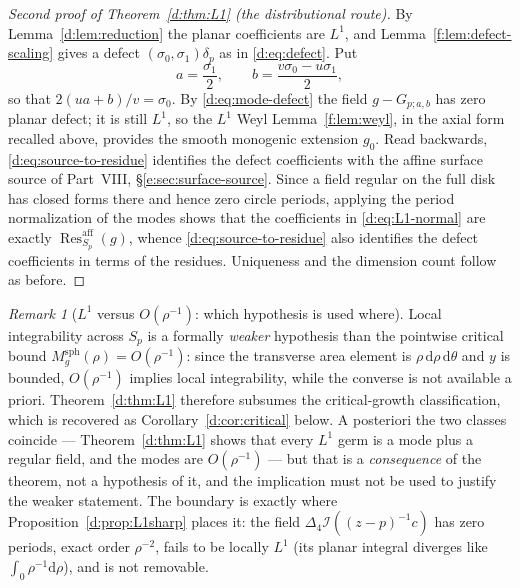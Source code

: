 \documentclass[11pt,a4paper]{article}
\numberwithin{equation}{section}
\theoremstyle{definition}
\theoremstyle{remark}
\newtheorem{remark}[theorem]{Remark}
\theoremstyle{plain}
\newcommand{\lap}{\Delta_4}
\newcommand{\I}{\mathcal I}
\newcommand{\Sp}{S_{p}}
\newcommand{\Msph}{M^{\mathrm{sph}}}                  %
\newcommand{\dd}{\mathrm d}
\newcommand{\Resaff}{\operatorname{Res}^{\mathrm{aff}}}
\begin{document}
\begin{proof}[Second proof of Theorem~\textup{\ref{d:thm:L1}} (the
distributional route)]
By Lemma~\ref{d:lem:reduction} the planar coefficients are $L^1$, and
Lemma~\ref{f:lem:defect-scaling} gives a defect
$(\sigma_0,\sigma_1)\delta_p$ as in \eqref{d:eq:defect}.  Put
\begin{equation}
 a=\frac{\sigma_1}{2},
 \qquad
 b=\frac{v\sigma_0-u\sigma_1}{2},
 \label{d:eq:source-to-residue}
\end{equation}
so that $2(ua+b)/v=\sigma_0$.  By \eqref{d:eq:mode-defect} the field
$g-G_{p;a,b}$ has zero planar defect; it is still $L^1$, so the $L^1$ Weyl
Lemma~\ref{f:lem:weyl}, in the axial form recalled above, provides the
smooth monogenic extension $g_0$.  Read backwards,
\eqref{d:eq:source-to-residue} identifies the defect coefficients with the
affine surface source of Part~VIII, \S\ref{e:sec:surface-source}.
Since a field regular on the full disk has closed forms there and hence
zero circle periods, applying the period normalization of the modes shows
that the coefficients in \eqref{d:eq:L1-normal} are exactly
$\Resaff_{\Sp}(g)$, whence \eqref{d:eq:source-to-residue} also identifies
the defect coefficients in terms of the residues.  Uniqueness and the
dimension count follow as before.
\end{proof}

\begin{remark}[$L^1$ versus $O(\rho^{-1})$: which hypothesis is used where]
\label{d:rem:L1-vs-O}
Local integrability across $\Sp$ is a formally \emph{weaker} hypothesis
than the pointwise critical bound $\Msph_g(\rho)=O(\rho^{-1})$: since the
transverse area element is $\rho\,\dd\rho\,\dd\theta$ and $y$ is bounded,
$O(\rho^{-1})$ implies local integrability, while the converse is not
available a priori.  Theorem~\ref{d:thm:L1} therefore subsumes the
critical-growth classification, which is recovered as
Corollary~\ref{d:cor:critical} below.  A posteriori the two classes
coincide --- Theorem~\ref{d:thm:L1} shows that every $L^1$ germ is a mode
plus a regular field, and the modes are $O(\rho^{-1})$ --- but that is a
\emph{consequence} of the theorem, not a hypothesis of it, and the
implication must not be used to justify the weaker statement.  The boundary
is exactly where Proposition~\ref{d:prop:L1sharp} places it: the field
$\lap\I((z-p)^{-1}c)$ has zero periods, exact order $\rho^{-2}$, fails to
be locally $L^1$ (its planar integral diverges like
$\int_0\rho^{-1}\dd\rho$), and is not removable.
\end{remark}
\end{document}
